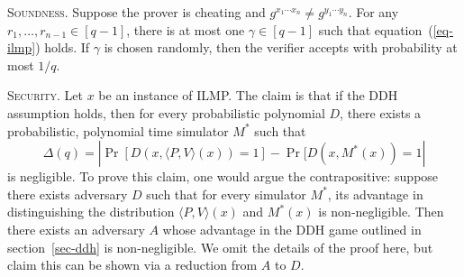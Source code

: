 \documentclass[letter]{article}
\newcommand{\heading}[1]{\noindent \textsc{#1}}
\newcommand{\brackets}[1]{\langle #1 \rangle}
\newcommand{\advD}{D}
\newcommand{\advA}{A}
\begin{document}
\heading{Soundness.}
Suppose the prover is cheating and $g^{x_1 \cdots x_n} \ne g^{y_1 \cdots y_n}$.
For any $r_1, \ldots, r_{n-1} \in [q-1]$, there is at most one $\gamma \in
[q-1]$ such that equation~(\ref{eq-ilmp}) holds. If $\gamma$ is chosen randomly,
then the verifier accepts with probability at most $1/q$.

\heading{Security.}
Let $x$ be an instance of ILMP.
The claim is that if the DDH assumption holds, then for every probabilistic
polynomial $\advD$, there exists a probabilistic, polynomial time simulator
$M^*$ such that
\[
  \Delta(q) = |\Pr[D(x, \brackets{P,V}(x))=1] - \Pr[D(x, M^*(x))=1|
\]
is negligible. To prove this claim, one would argue the contrapositive: suppose
there exists adversary $\advD$ such that for every simulator $M^*$, its
advantage in distinguishing the distribution $\brackets{P,V}(x)$ and $M^*(x)$ is
non-negligible. Then there exists an adversary $\advA$ whose advantage in the DDH
game outlined in section~\ref{sec-ddh} is non-negligible. We omit the details of
the proof here, but claim this can be shown via a reduction from $\advA$ to
$\advD$.
\end{document}
